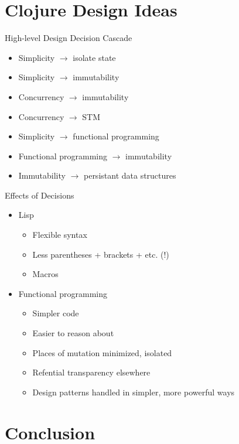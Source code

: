 \documentclass{beamer}
\begin{document}
\section{Clojure Design Ideas}

\begin{frame}{High-level Design Decision Cascade}
  \begin{itemize}
  \item Simplicity $\rightarrow$ isolate state
  \item Simplicity $\rightarrow$ immutability
  \item Concurrency $\rightarrow$ immutability
  \item Concurrency $\rightarrow$ STM
  \item Simplicity $\rightarrow$ functional programming
  \item Functional programming $\rightarrow$ immutability
  \item Immutability $\rightarrow$ persistant data structures
  \end{itemize}
\end{frame}

\begin{frame}{Effects of Decisions}
  \begin{itemize}
  \item Lisp
    \begin{itemize}
    \item Flexible syntax
    \item Less parentheses + brackets + etc. (!)
    \item Macros
    \end{itemize}
  \item Functional programming
    \begin{itemize}
    \item Simpler code
    \item Easier to reason about
    \item Places of mutation minimized, isolated
    \item Refential transparency elsewhere
    \item Design patterns handled in simpler, more powerful ways
    \end{itemize}
  \end{itemize}
\end{frame}


\section{Conclusion}
\end{document}
